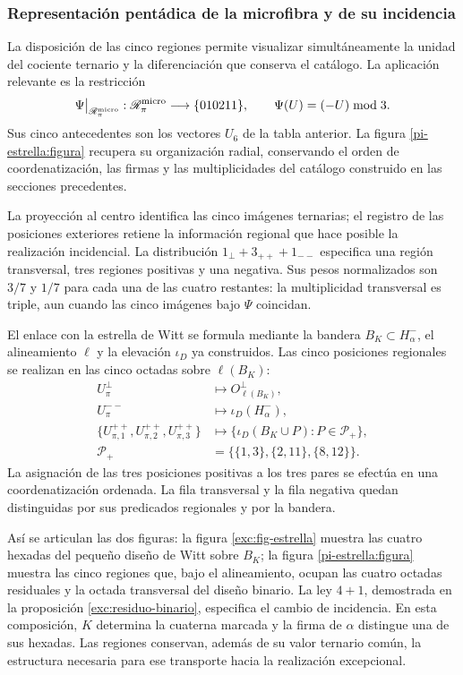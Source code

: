 \subsubsection{Representación pentádica de la microfibra y de su incidencia}
\label{pi-estrella:desarrollo}

La disposición de las cinco regiones permite visualizar simultáneamente
la unidad del cociente ternario y la diferenciación que conserva el
catálogo. La aplicación relevante es la restricción
\[
 \Psi\big|_{\mathscr R_\pi^{\rm micro}}:
 \mathscr R_\pi^{\rm micro}\longrightarrow\{010211\},
 \qquad \Psi(U)=(-U)\bmod3.
\]
Sus cinco antecedentes son los vectores \(U_6\) de la tabla anterior.
La figura \ref{pi-estrella:figura} recupera su organización radial,
conservando el orden de coordenatización, las firmas y las multiplicidades del catálogo
construido en las secciones precedentes.



La proyección al centro identifica las cinco imágenes ternarias; el
registro de las posiciones exteriores retiene la información regional
que hace posible la realización incidencial. La distribución
\(1_\perp+3_{++}+1_{--}\) especifica una región transversal, tres
regiones positivas y una negativa. Sus pesos normalizados son
\(3/7\) y \(1/7\) para cada una de las cuatro restantes: la
multiplicidad transversal es triple, aun cuando las cinco imágenes bajo
\(\Psi\) coincidan.

El enlace con la estrella de Witt se formula mediante la bandera
\(B_K\subset H^-_\alpha\), el alineamiento \(\ell\) y la
elevación \(\iota_D\) ya construidos. Las cinco posiciones regionales
se realizan en las cinco octadas sobre \(\ell(B_K)\):
\[
\begin{aligned}
 U_\pi^\perp&\longmapsto O^\perp_{\ell(B_K)},\\
 U_\pi^{--}&\longmapsto\iota_D(H^-_\alpha),\\
 \{U_{\pi,1}^{++},U_{\pi,2}^{++},U_{\pi,3}^{++}\}
 &\longmapsto
 \{\iota_D(B_K\cup P):P\in\mathcal P_+\},\\
 \mathcal P_+&=\bigl\{\{1,3\},\{2,11\},\{8,12\}\bigr\}.
\end{aligned}
\]
La asignación de las tres posiciones positivas a los tres pares se
efectúa en una coordenatización ordenada. La fila transversal y la fila negativa
quedan distinguidas por sus predicados regionales y por la bandera.

Así se articulan las dos figuras: la figura
\ref{exc:fig-estrella} muestra las cuatro hexadas del pequeño diseño
de Witt sobre \(B_K\); la figura \ref{pi-estrella:figura} muestra
las cinco regiones que, bajo el alineamiento, ocupan las cuatro octadas
residuales y la octada transversal del diseño binario. La ley
\(4+1\), demostrada en la proposición
\ref{exc:residuo-binario}, especifica el cambio de incidencia. En esta
composición, \(K\) determina la cuaterna marcada y la firma de
\(\alpha\) distingue una de sus hexadas. Las regiones conservan,
además de su valor ternario común, la estructura necesaria para ese
transporte hacia la realización excepcional.
